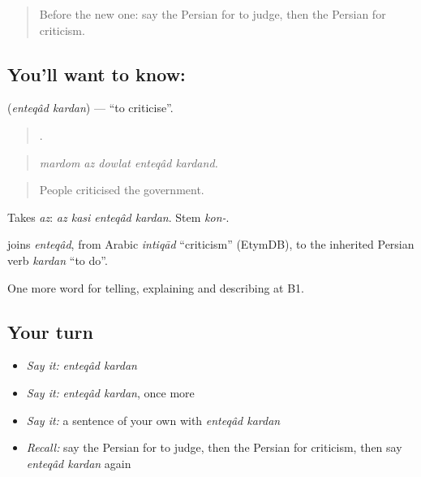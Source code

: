 \label{lesson:FA-C365-enteqad-kardan}



\begin{quote}
Before the new one: say the Persian for to judge, then the Persian for criticism.
\end{quote}

\subsection*{You'll want to know:  }
\textbf{ } (\emph{enteqâd kardan}) — \textquotedblleft{}to criticise\textquotedblright{}.

\begin{quote}
    .
\end{quote}

\begin{quote}
\emph{mardom az dowlat enteqâd kardand.}
\end{quote}

\begin{quote}
People criticised the government.
\end{quote}

Takes \emph{az}: \emph{az kasi enteqâd kardan}. Stem \emph{kon-}.

\begin{cousinweb}
\textbf{ } joins \emph{enteqâd}, from Arabic \emph{intiqād} \textquotedblleft{}criticism\textquotedblright{} (EtymDB), to the inherited Persian verb \emph{kardan} \textquotedblleft{}to do\textquotedblright{}.
\end{cousinweb}

\begin{grammarlens}[title={What you've built}]
One more word for telling, explaining and describing at B1.
\end{grammarlens}

\subsection*{Your turn}
\begin{itemize}
\raggedright
  \item \emph{Say it:} \emph{enteqâd kardan}
  \item \emph{Say it:} \emph{enteqâd kardan}, once more
  \item \emph{Say it:} a sentence of your own with \emph{enteqâd kardan}
  \item \emph{Recall:} say the Persian for to judge, then the Persian for criticism, then say \emph{enteqâd kardan} again
\end{itemize}

